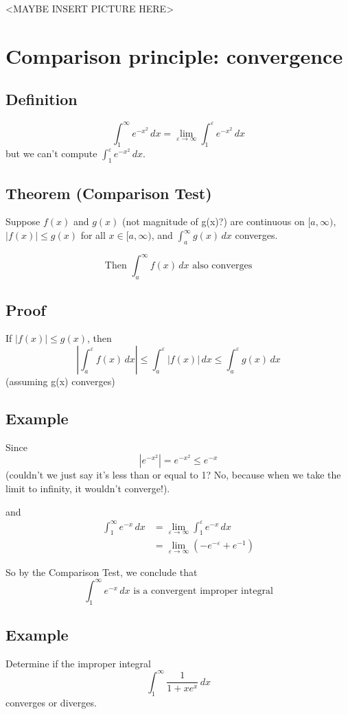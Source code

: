 \documentclass[11pt]{article}
\begin{document}
<MAYBE INSERT PICTURE HERE>

\section{Comparison principle: convergence}
\subsection*{Definition}
\[ \int_1^\infty e^{-x^2} \,dx = \lim_{\varepsilon\rightarrow\infty} \int_1^\varepsilon e^{-x^2} \,dx \]
but we can't compute $\int_1^\varepsilon e^{-x^2} \,dx$.

\subsection*{Theorem (Comparison Test)}
Suppose $f(x)$ and $g(x)$ (not magnitude of g(x)?) are continuous on $[a, \infty)$, $|f(x)| \leq g(x) $ for all $ x\in[a,\infty) $, and $\int_a^\infty g(x) \,dx$ converges.

\[ \text{Then } \int_a^\infty f(x) \,dx \text{ also converges} \]

\subsection*{Proof}
If $|f(x)| \leq g(x) $, then
\[ \left| \int_a^\varepsilon f(x) \,dx \right| \leq \int_a^\varepsilon |f(x)| \,dx \leq \int_a^\varepsilon g(x) \,dx \]
(assuming g(x) converges)

\subsection*{Example}
Since
\[ \left| e^{-x^2} \right| = e^{-x^2} \leq e^{-x} \]
(couldn't we just say it's less than or equal to 1? No, because when we take the limit to infinity, it wouldn't converge!).

and
\begin{align*}
\int_1^\infty e^{-x} \,dx &= \lim_{\varepsilon\rightarrow\infty} \int_1^\varepsilon e^{-x} \,dx \\
 &= \lim_{\varepsilon\rightarrow\infty} \left( -e^{-\varepsilon} + e^{-1} \right)
\end{align*}

So by the Comparison Test, we conclude that 
\[ \int_1^\infty e^{-x} \,dx \text{ is a convergent improper integral} \]

\subsection*{Example}
Determine if the improper integral
\[ \int_1^\infty \frac{1}{1+xe^x} \,dx \]
converges or diverges.
\end{document}
